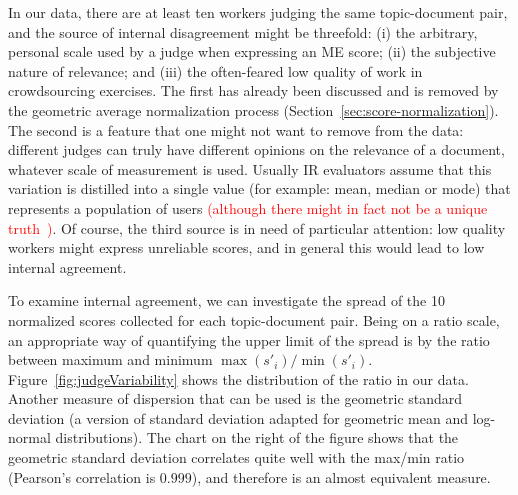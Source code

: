 In our data, there are
at least ten workers judging the same topic-document pair, and
the source of internal disagreement might be threefold:
(i) the arbitrary, personal scale used by a judge when expressing an ME
score; 
(ii) the subjective nature of relevance; and 
(iii) the often-feared low quality of work in crowdsourcing exercises.
The first has already been discussed and is removed by the geometric
average normalization process (Section~\ref{sec:score-normalization}).
The second is a feature that one might not want to remove from the
data: different judges can truly have different opinions on the
relevance of a document, whatever scale of measurement is used.
Usually IR evaluators assume that this variation is distilled into a single 
value (for example: mean, median or mode) 
that represents a population of users \textcolor{red}{(although there might in fact not be a unique truth~\citep{aroyo2015truth})}.
Of course, the third source is in need of particular attention: low
quality workers might express unreliable scores, and in general this
would lead to low internal agreement.

To examine internal agreement, we can investigate the spread of 
the 10 normalized scores collected for each topic-document pair.
Being on a ratio scale, an appropriate way of quantifying the upper
limit of the spread is
by the ratio between maximum and minimum $\max(s'_i) / \min(s'_i)$.  
Figure~\ref{fig:judgeVariability} 
shows the distribution of the ratio in our data.
Another measure of dispersion that can be used is the geometric
standard deviation (a version of standard deviation adapted for
geometric mean and log-normal distributions). 
The chart on the right of the figure shows that the geometric standard
deviation correlates quite well with the max/min ratio (Pearson's
correlation is $0.999$), and therefore is an almost equivalent
measure. 

